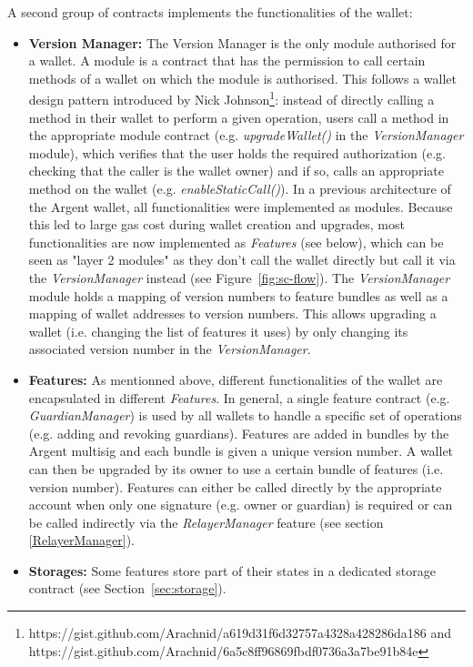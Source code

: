\documentclass[12pt]{article}
\begin{document}
A second group of contracts implements the functionalities of the wallet:
\begin{itemize}
    \item \textbf{Version Manager:} The Version Manager is the only module authorised for a wallet. A module is a contract that has the permission to call certain methods of a wallet on which the module is authorised. This follows a wallet design pattern introduced by Nick Johnson\footnote{https://gist.github.com/Arachnid/a619d31f6d32757a4328a428286da186 and https://gist.github.com/Arachnid/6a5c8ff96869fbdf0736a3a7be91b84e}: instead of directly calling a method in their wallet to perform a given operation, users call a method in the appropriate module contract (e.g. \emph{upgradeWallet()} in the \emph{VersionManager} module), which  verifies that the user holds the required authorization (e.g. checking that the caller is the wallet owner) and if so, calls an appropriate method on the wallet (e.g. \emph{enableStaticCall()}). 
    In a previous architecture of the Argent wallet, all functionalities were implemented as modules. Because this led to large gas cost during wallet creation and upgrades, most functionalities are now implemented as \emph{Features} (see below), which can be seen as "layer 2 modules" as they don't call the wallet directly but call it via the \emph{VersionManager} instead (see Figure~\ref{fig:sc-flow}). 
    The \emph{VersionManager} module holds a mapping of version numbers to feature bundles as well as a mapping of wallet addresses to version numbers. This allows upgrading a wallet (i.e. changing the list of features it uses) by only changing its associated version number in the \emph{VersionManager}.
    \item \textbf{Features:} As mentionned above, different functionalities of the wallet are encapsulated in different \emph{Features}. In general, a single feature contract (e.g. \emph{GuardianManager}) is used by all wallets to handle a specific set of operations (e.g. adding and revoking guardians). Features are added in bundles by the Argent multisig and each bundle is given a unique version number. A wallet can then be upgraded by its owner to use a certain bundle of features (i.e. version number).
    Features can either be called directly by the appropriate account when only one signature (e.g. owner or guardian) is required or can be called indirectly via the \emph{RelayerManager} feature (see section \ref{RelayerManager}).
    \item \textbf{Storages:} Some features store part of their states in a dedicated storage contract (see Section~\ref{sec:storage}).

\end{itemize}
\end{document}
